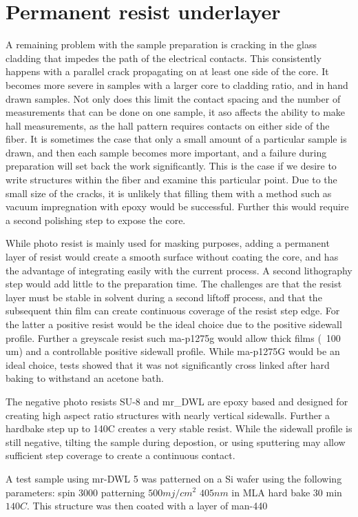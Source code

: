 
\chapter{Permanent resist underlayer}
A remaining problem with the sample preparation is cracking in the glass cladding that impedes the path of the electrical contacts. This consistently happens with a parallel crack propagating on at least one side of the core. It becomes more severe in samples with a larger core to cladding ratio, and in hand drawn samples. Not only does this limit the contact spacing and the number of measurements that can be done on one sample, it aso affects the ability to make hall measurements, as the hall pattern requires contacts on either side of the fiber. It is sometimes the case that only a small amount of a particular sample is drawn, and then each sample becomes more important, and a failure during preparation will set back the work significantly. This is the case if we desire to write structures within the fiber and examine this particular point. Due to the small size of the cracks, it is unlikely that filling them with a method such as vacuum impregnation with epoxy would be successful. Further this would require a second polishing step to expose the core.

While photo resist is mainly used for masking purposes, adding a permanent layer of resist would create a smooth surface without coating the core, and has the advantage of integrating easily with the current process. A second lithography step would add little to the preparation time. The challenges are that the resist layer must be stable in solvent during a second liftoff process, and that the subsequent thin film can create continuous coverage of the resist step edge. For the latter a positive resist would be the ideal choice due to the positive sidewall profile. Further a greyscale resist such ma-p1275g  would allow thick films (~100 um) and a controllable positive sidewall profile. While ma-p1275G would be an ideal choice, tests showed that it was not significantly cross linked after hard baking to withstand an acetone bath. 

The negative photo resists SU-8 and mr_DWL are epoxy based and designed for creating high aspect ratio structures with nearly vertical sidewalls. Further a hardbake step up to 140C creates a very stable resist. While the sidewall profile is still negative, tilting the sample during depostion, or using sputtering may allow sufficient step coverage to create a continuous contact. 

A test sample using mr-DWL 5 was patterned on a Si wafer using the following parameters: spin 3000 patterning $500 mj/cm^2$ $405nm$ in MLA hard bake 30 min $140C$. This structure was then coated with a layer of man-440 



\cleardoublepage